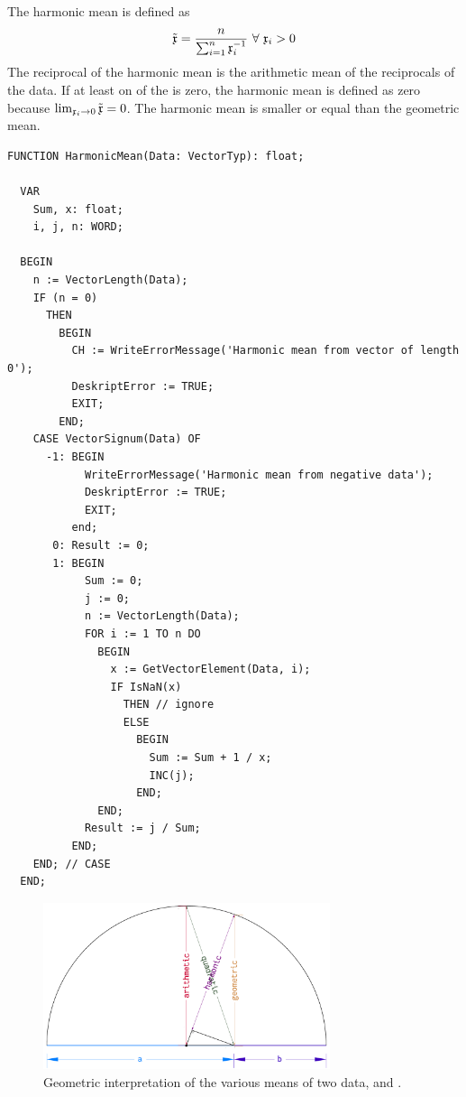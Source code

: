\begin{refsection}
The harmonic mean is defined as
\begin{equation}
  \tilde{\mathfrak{x}} = \frac{n}{\sum_{i=1}^n{\mathfrak{x}_i^{-1}}} \ \forall\ \mathfrak{x}_i > 0
\end{equation}
The reciprocal of the harmonic mean is the arithmetic mean of the reciprocals of the data. If at least on of the  is zero, the harmonic mean is defined as zero because \( \lim_{\mathfrak{x}_i \rightarrow 0}  \tilde{\mathfrak{x}} = 0 \). The harmonic mean is smaller or equal than the geometric mean.

\begin{lstlisting}[caption=Harmonic mean]
  FUNCTION HarmonicMean(Data: VectorTyp): float;

  VAR
    Sum, x: float;
    i, j, n: WORD;

  BEGIN
    n := VectorLength(Data);
    IF (n = 0)
      THEN
        BEGIN
          CH := WriteErrorMessage('Harmonic mean from vector of length 0');
          DeskriptError := TRUE;
          EXIT;
        END;
    CASE VectorSignum(Data) OF
      -1: BEGIN
            WriteErrorMessage('Harmonic mean from negative data');
            DeskriptError := TRUE;
            EXIT;
          end;
       0: Result := 0;
       1: BEGIN
            Sum := 0;
            j := 0;
            n := VectorLength(Data);
            FOR i := 1 TO n DO
              BEGIN
                x := GetVectorElement(Data, i);
                IF IsNaN(x)
                  THEN // ignore
                  ELSE
                    BEGIN
                      Sum := Sum + 1 / x;
                      INC(j);
                    END;
              END;
            Result := j / Sum;
          END;
    END; // CASE
  END;
\end{lstlisting}

\begin{figure}
 \caption{Geometric interpretation of the various means of two data,  and . }
 \label{fig:GeoMean}
 \centering
 \includegraphics[width=0.75\textwidth]{Graphics/GeometricInterpretationMean}
\end{figure}


\end{refsection}
